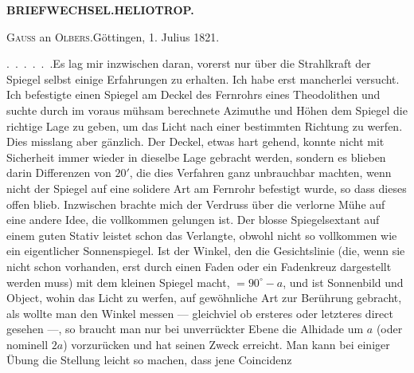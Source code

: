 \par\clearpage
\noindent\null\hfill{\small\textbf{BRIEFWECHSEL.\quad HELIOTROP.}}\hfill{}\par
\vspace*{4.2cm}
\begin{center}{\fontsize{19}{24}\selectfont{}}\end{center}
\vspace*{1.5cm}
\begin{center}{\large\textsc{Gauss} an \textsc{Olbers}.\quad Göttingen, 1. Julius 1821.}\end{center}
\par\noindent\hspace*{\parindent}.\ .\ .\ .\ .\ .\enspace Es lag mir inzwischen daran, vorerst nur über die Strahlkraft der Spiegel selbst einige Erfahrungen zu erhalten. Ich habe erst mancherlei versucht. Ich befestigte einen Spiegel am Deckel des Fernrohrs eines Theodolithen und suchte durch im voraus mühsam berechnete Azimuthe und Höhen dem Spiegel die richtige Lage zu geben, um das Licht nach einer bestimmten Richtung zu werfen. Dies misslang aber gänzlich. Der Deckel, etwas hart gehend, konnte nicht mit Sicherheit immer wieder in dieselbe Lage gebracht werden, sondern es blieben darin Differenzen von $20'$, die dies Verfahren ganz unbrauchbar machten, wenn nicht der Spiegel auf eine solidere Art am Fernrohr befestigt wurde, so dass dieses offen blieb. Inzwischen brachte mich der Verdruss über die verlorne Mühe auf eine andere Idee, die vollkommen gelungen ist. Der blosse Spiegelsextant auf einem guten Stativ leistet schon das Verlangte, obwohl nicht so vollkommen wie ein eigentlicher Sonnenspiegel. Ist der Winkel, den die Gesichtslinie (die, wenn sie nicht schon vorhanden, erst durch einen Faden oder ein Fadenkreuz dargestellt werden muss) mit dem kleinen Spiegel macht, $=90^\circ-a$, und ist Sonnenbild und Object, wohin das Licht zu werfen, auf gewöhnliche Art zur Berührung gebracht, als wollte man den Winkel messen --- gleichviel ob ersteres oder letzteres direct gesehen ---, so braucht man nur bei unverrückter Ebene die Alhidade um $a$ (oder nominell $2a$) vorzurücken und hat seinen Zweck erreicht. Man kann bei einiger Übung die Stellung leicht so machen, dass jene Coincidenz
\par\medskip\noindent\makebox[.86\linewidth][r]{59\textsuperscript{*}}\par
